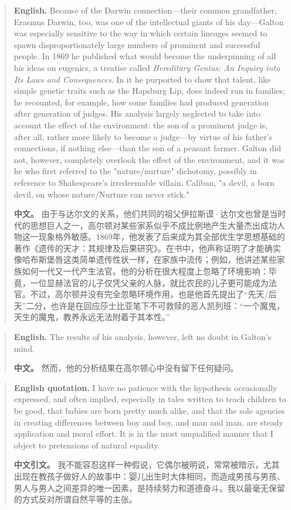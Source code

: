\begin{quote}
\noindent\textbf{English.} Because of the Darwin connection---their common grandfather, Erasmus Darwin, too, was one of the intellectual giants of his day---Galton was especially sensitive to the way in which certain lineages seemed to spawn disproportionately large numbers of prominent and successful people. In 1869 he published what would become the underpinning of all his ideas on eugenics, a treatise called \emph{Hereditary Genius: An Inquiry into Its Laws and Consequences}. In it he purported to show that talent, like simple genetic traits such as the Hapsburg Lip, does indeed run in families; he recounted, for example, how some families had produced generation after generation of judges. His analysis largely neglected to take into account the effect of the environment: the son of a prominent judge is, after all, rather more likely to become a judge---by virtue of his father's connections, if nothing else---than the son of a peasant farmer. Galton did not, however, completely overlook the effect of the environment, and it was he who first referred to the "nature/nurture" dichotomy, possibly in reference to Shakespeare's irredeemable villain, Caliban, "a devil, a born devil, on whose nature/Nurture can never stick."

\smallskip
\noindent\textbf{中文。} 由于与达尔文的关系，他们共同的祖父伊拉斯谟·达尔文也曾是当时代的思想巨人之一，高尔顿对某些家系似乎不成比例地产生大量杰出成功人物这一现象格外敏感。1869年，他发表了后来成为其全部优生学思想基础的著作《遗传的天才：其规律及后果研究》。在书中，他声称证明了才能确实像哈布斯堡唇这类简单遗传性状一样，在家族中流传；例如，他讲述某些家族如何一代又一代产生法官。他的分析在很大程度上忽略了环境影响：毕竟，一位显赫法官的儿子仅凭父亲的人脉，就比农民的儿子更可能成为法官。不过，高尔顿并没有完全忽略环境作用，也是他首先提出了“先天/后天”二分，也许是在回应莎士比亚笔下不可救赎的恶人凯列班：“一个魔鬼，天生的魔鬼，教养永远无法附着于其本性。”
\end{quote}

\begin{quote}
\noindent\textbf{English.} The results of his analysis, however, left no doubt in Galton's mind.

\smallskip
\noindent\textbf{中文。} 然而，他的分析结果在高尔顿心中没有留下任何疑问。
\end{quote}

\begin{quote}
\noindent\textbf{English quotation.} I have no patience with the hypothesis occasionally expressed, and often implied, especially in tales written to teach children to be good, that babies are born pretty much alike, and that the sole agencies in creating differences between boy and boy, and man and man, are steady application and moral effort. It is in the most unqualified manner that I object to pretensions of natural equality.

\smallskip
\noindent\textbf{中文引文。} 我不能容忍这样一种假说，它偶尔被明说，常常被暗示，尤其出现在教孩子做好人的故事中：婴儿出生时大体相同，而造成男孩与男孩、男人与男人之间差异的唯一因素，是持续努力和道德奋斗。我以最毫无保留的方式反对所谓自然平等的主张。
\end{quote}

